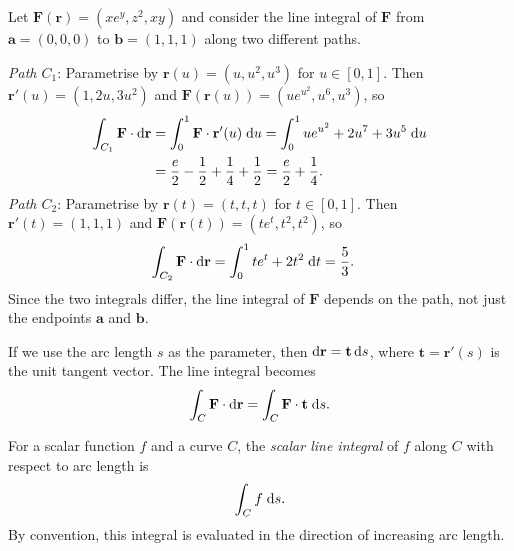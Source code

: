\documentclass[a4paper]{article}
\begin{document}
\begin{eg}
  Let $\mathbf{F}(\mathbf{r}) = (xe^y, z^2, xy)$ and consider the line integral of $\mathbf{F}$ from $\mathbf{a}=(0, 0, 0)$ to $\mathbf{b}=(1, 1, 1)$ along two different paths.
  \begin{center}
  \end{center}
  \emph{Path $C_1$}: Parametrise by $\mathbf{r}(u) = (u, u^2, u^3)$ for $u \in [0,1]$. Then $\mathbf{r}'(u) = (1, 2u, 3u^2)$ and $\mathbf{F}(\mathbf{r}(u)) = (ue^{u^2}, u^6, u^3)$, so
  \begin{align*}
    \int_{C_1} \mathbf{F}\cdot \mathrm{d}\mathbf{r} &= \int_0^1 \mathbf{F}\cdot\mathbf{r}'(u)\; \mathrm{d} u = \int_0^1 ue^{u^2} + 2u^7 + 3u^5\;\mathrm{d} u\\
    &= \frac{e}{2} -\frac{1}{2} + \frac{1}{4} + \frac{1}{2} = \frac{e}{2} + \frac{1}{4}.
  \end{align*}
  \emph{Path $C_2$}: Parametrise by $\mathbf{r}(t) = (t, t, t)$ for $t \in [0,1]$. Then $\mathbf{r}'(t) = (1, 1, 1)$ and $\mathbf{F}(\mathbf{r}(t)) = (te^{t}, t^2, t^2)$, so
  \begin{align*}
    \int_{C_2} \mathbf{F}\cdot \mathrm{d} \mathbf{r} &= \int_0^1 te^t + 2t^2\; \mathrm{d} t = \frac{5}{3}.
  \end{align*}
  Since the two integrals differ, the line integral of $\mathbf{F}$ depends on the path, not just the endpoints $\mathbf{a}$ and $\mathbf{b}$.
\end{eg}

\begin{rmk}
  If we use the arc length $s$ as the parameter, then $\mathrm{d} \mathbf{r} = \mathbf{t}\,\mathrm{d} s$, where $\mathbf{t} = \mathbf{r}'(s)$ is the unit tangent vector. The line integral becomes
  \[
    \int_C \mathbf{F}\cdot \mathrm{d} \mathbf{r} = \int_C \mathbf{F}\cdot \mathbf{t}\;\mathrm{d} s.
  \]
\end{rmk}

\begin{defi}
  For a scalar function $f$ and a curve $C$, the \emph{scalar line integral} of $f$ along $C$ with respect to arc length is
  \[
    \int_C f\;\mathrm{d} s.
  \]
  By convention, this integral is evaluated in the direction of increasing arc length.
\end{defi}
\end{document}
